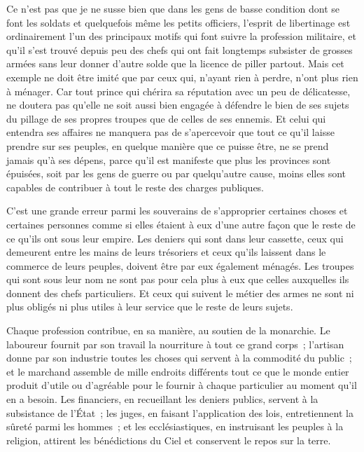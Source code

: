 \documentclass[french,twoside]{book} %
\begin{document}
Ce n’est pas que je ne susse bien que dans les gens de basse condition dont se font les soldats et quelquefois même les petits officiers, l’esprit de libertinage est ordinairement l’un des principaux motifs qui font suivre la profession militaire, et qu’il s’est trouvé depuis peu des chefs qui ont fait longtemps subsister de grosses armées sans leur donner d’autre solde que la licence de piller partout. Mais cet exemple ne doit être imité que par ceux qui, n’ayant rien à perdre, n’ont plus rien à ménager. Car tout prince qui chérira sa réputation avec un peu de délicatesse, ne doutera pas qu’elle ne soit aussi bien engagée à défendre le bien de ses sujets du pillage de ses propres troupes que de celles de ses ennemis. Et celui qui entendra ses affaires ne manquera pas de s’apercevoir que tout ce qu’il laisse prendre sur ses peuples, en quelque manière que ce puisse être, ne se prend jamais qu’à ses dépens, parce qu’il est manifeste que plus les provinces sont épuisées, soit par les gens de guerre ou par quelqu’autre cause, moins elles sont capables de contribuer à tout le reste des charges publiques.\par
C’est une grande erreur parmi les souverains de s’approprier certaines choses et certaines personnes comme si elles étaient à eux d’une autre façon que le reste de ce qu’ils ont sous leur empire. Les deniers qui sont dans leur cassette, ceux qui demeurent entre les mains de leurs trésoriers et ceux qu’ils laissent dans le commerce de leurs peuples, doivent être par eux également ménagés. Les troupes qui sont sous leur nom ne sont pas pour cela plus à eux que celles auxquelles ils donnent des chefs particuliers. Et ceux qui suivent le métier des armes ne sont ni plus obligés ni plus utiles à leur service que le reste de leurs sujets.\par
Chaque profession contribue, en sa manière, au soutien de la monarchie. Le laboureur fournit par son travail la nourriture à tout ce grand corps ; l’artisan donne par son industrie toutes les choses qui servent à la commodité du public ; et le marchand assemble de mille endroits différents tout ce que le monde entier produit d’utile ou d’agréable pour le fournir à chaque particulier au moment qu’il en a besoin. Les financiers, en recueillant les deniers publics, servent à la subsistance de l’État ; les juges, en faisant l’application des lois, entretiennent la sûreté parmi les hommes ; et les ecclésiastiques, en instruisant les peuples à la religion, attirent les bénédictions du Ciel et conservent le repos sur la terre.\par
\end{document}
